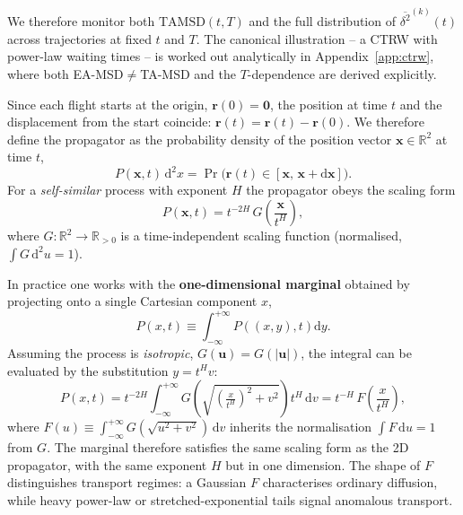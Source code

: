 \begin{description}
        \smallskip
        We therefore monitor both $\mathrm{TAMSD}(t,T)$ and the full distribution of
        $\overline{\delta^2}^{(k)}(t)$ across trajectories at fixed $t$ and $T$. The
        canonical illustration -- a CTRW with power-law waiting times -- is worked out
        analytically in Appendix~\ref{app:ctrw}, where both EA-MSD$\neq$TA-MSD and the
        $T$-dependence are derived explicitly.
  \item[Propagator.] Since each flight starts at the origin,
        $\mathbf{r}(0)=\mathbf{0}$, the position at time $t$ and the displacement from the
        start coincide: $\mathbf{r}(t)=\mathbf{r}(t)-\mathbf{r}(0)$. We therefore define the
        propagator as the probability density of the position vector $\mathbf{x}\in\mathbb{R}^2$
        at time $t$,
        \begin{equation}
          P(\mathbf{x},t)\,\mathrm{d}^2x
          = \Pr\!\bigl(\mathbf{r}(t)\in[\mathbf{x},\,\mathbf{x}+\mathrm{d}\mathbf{x}]\bigr).
        \end{equation}
        For a \emph{self-similar} process with exponent $H$ the propagator obeys the scaling form
        \begin{equation}
          P(\mathbf{x},t) = t^{-2H}\,G\!\left(\frac{\mathbf{x}}{t^H}\right),
          \label{eq:prop-scaling-2d}
        \end{equation}
        where $G:\mathbb{R}^2\to\mathbb{R}_{>0}$ is a time-independent scaling function
        (normalised, $\int G\,\mathrm{d}^2u=1$). 

        In practice one works with the \textbf{one-dimensional marginal} obtained by
        projecting onto a single Cartesian component $x$,
        \begin{equation}
          P(x,t) \equiv \int_{-\infty}^{+\infty} P\!\left((x,y),t\right)\mathrm{d}y .
        \end{equation}
        Assuming the process is \emph{isotropic}, $G(\mathbf{u})=G(|\mathbf{u}|)$, the
        integral can be evaluated by the substitution $y=t^H v$:
        \begin{equation}
          P(x,t) = t^{-2H}\int_{-\infty}^{+\infty}
          G\!\left(\sqrt{\!\left(\tfrac{x}{t^H}\right)^{\!2}+v^2}\right)t^H\,\mathrm{d}v
          = t^{-H}\,F\!\left(\frac{x}{t^H}\right),
          \label{eq:marginal-scaling}
        \end{equation}
        where $F(u)\equiv\int_{-\infty}^{+\infty}G(\sqrt{u^2+v^2})\,\mathrm{d}v$ inherits
        the normalisation $\int F\,\mathrm{d}u=1$ from $G$. The marginal therefore satisfies
        the same scaling form as the 2D propagator, with the same exponent $H$ but in one
        dimension. The shape of $F$ distinguishes transport regimes: a Gaussian $F$
        characterises ordinary diffusion, while heavy power-law or stretched-exponential tails
        signal anomalous transport.


\end{description}
